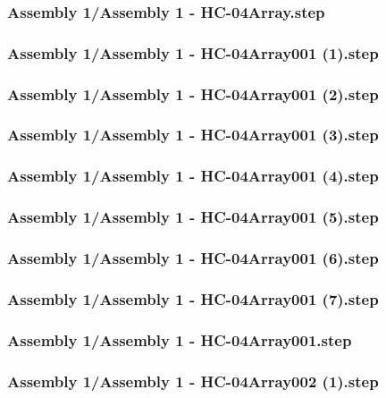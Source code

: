 \documentclass[a4paper,12pt]{article}
\begin{document}
\begin{lstlising}[language=C++]
\subsubsection{Assembly 1/Assembly 1 - HC-04Array.step}

\subsubsection{Assembly 1/Assembly 1 - HC-04Array001 (1).step}

\subsubsection{Assembly 1/Assembly 1 - HC-04Array001 (2).step}

\subsubsection{Assembly 1/Assembly 1 - HC-04Array001 (3).step}

\subsubsection{Assembly 1/Assembly 1 - HC-04Array001 (4).step}

\subsubsection{Assembly 1/Assembly 1 - HC-04Array001 (5).step}

\subsubsection{Assembly 1/Assembly 1 - HC-04Array001 (6).step}

\subsubsection{Assembly 1/Assembly 1 - HC-04Array001 (7).step}

\subsubsection{Assembly 1/Assembly 1 - HC-04Array001.step}

\subsubsection{Assembly 1/Assembly 1 - HC-04Array002 (1).step}


\end{lstlising}
\end{document}
